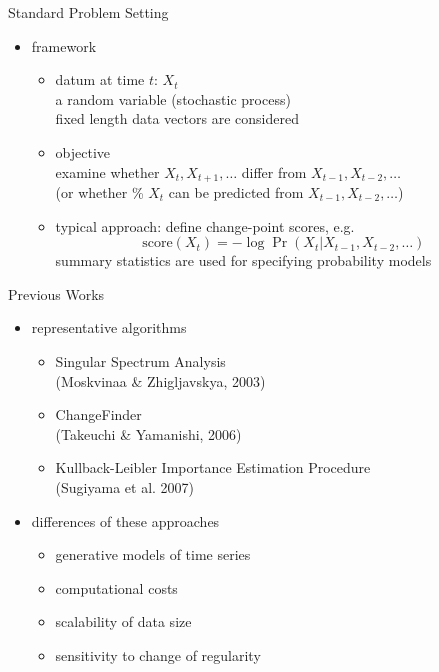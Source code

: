 \documentclass[fleqn,aspectratio=1610]{beamer}
\begin{document}
\begin{frame}[label={sec:orgd98c5c8}]{Standard Problem Setting}
\begin{itemize}
\item framework
\begin{itemize}
\item datum at time \(t\):  \(X_t\)\\[0pt]
a random variable (stochastic process)\\[0pt]
\alert{fixed length data vectors are considered}
\item objective \\[0pt]
examine whether \(X_t,X_{t+1},\dotsc\) differ from
\(X_{t-1},X_{t-2},\dotsc\) \\[4pt]
(or whether \%
\(X_t\) can be predicted from \(X_{t-1},X_{t-2},\dotsc\))
\item typical approach: define change-point scores, e.g.
\begin{equation}
  \mathrm{score}(X_t)=-\log\Pr(X_t|X_{t-1},X_{t-2},\dotsc)
\end{equation}
\alert{summary statistics are used for specifying probability models}
\end{itemize}
\end{itemize}
\end{frame}

\begin{frame}[label={sec:org1bd31dd}]{Previous Works}
\begin{itemize}
\item representative algorithms
\begin{itemize}
\item Singular Spectrum Analysis \\[0pt]
(Moskvinaa \& Zhigljavskya, 2003) \nocite{MoskvinaZhigljavsky2003}
\item ChangeFinder \\[0pt]
(Takeuchi \& Yamanishi, 2006) \nocite{TakeuchiYamanishi2006}
\item Kullback-Leibler Importance Estimation Procedure \\[0pt]
(Sugiyama et al. 2007) \nocite{Sugiyama_etal2007nips}
\end{itemize}
\item differences of these approaches
\begin{itemize}
\item generative models of time series
\item computational costs
\item scalability of data size
\item sensitivity to change of regularity
\end{itemize}
\end{itemize}
\end{frame}
\end{document}
